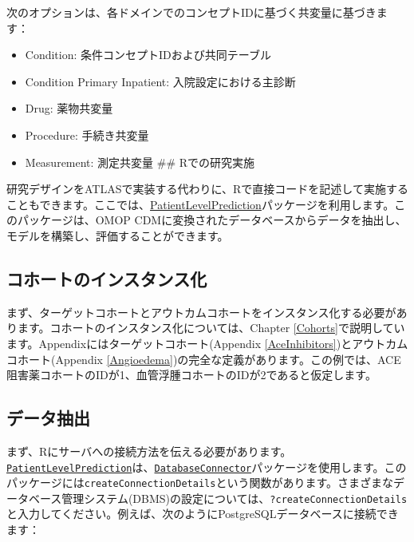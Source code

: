 \documentclass[
  11pt]{book}
\providecommand{\tightlist}{%
  \setlength{\itemsep}{0pt}\setlength{\parskip}{0pt}}
\theoremstyle{definition}
\theoremstyle{definition}
\theoremstyle{definition}
\theoremstyle{definition}
\theoremstyle{remark}
\begin{document}
次のオプションは、各ドメインでのコンセプトIDに基づく共変量に基づきます：

\begin{itemize}
\tightlist
\item
  Condition: 条件コンセプトIDおよび共同テーブル
\item
  Condition Primary Inpatient: 入院設定における主診断
\item
  Drug: 薬物共変量
\item
  Procedure: 手続き共変量
\item
  Measurement: 測定共変量
  \#\# Rでの研究実施
\end{itemize}

研究デザインをATLASで実装する代わりに、Rで直接コードを記述して実施することもできます。ここでは、\href{https://ohdsi.github.io/PatientLevelPrediction/}{PatientLevelPrediction}パッケージを利用します。このパッケージは、OMOP CDMに変換されたデータベースからデータを抽出し、モデルを構築し、評価することができます。

\subsection{コホートのインスタンス化}\label{ux30b3ux30dbux30fcux30c8ux306eux30a4ux30f3ux30b9ux30bfux30f3ux30b9ux5316-1}

まず、ターゲットコホートとアウトカムコホートをインスタンス化する必要があります。コホートのインスタンス化については、Chapter \ref{Cohorts}で説明しています。Appendixにはターゲットコホート(Appendix \ref{AceInhibitors})とアウトカムコホート(Appendix \ref{Angioedema})の完全な定義があります。この例では、ACE阻害薬コホートのIDが1、血管浮腫コホートのIDが2であると仮定します。

\subsection{データ抽出}\label{ux30c7ux30fcux30bfux62bdux51fa-2}

まず、Rにサーバへの接続方法を伝える必要があります。\href{https://ohdsi.github.io/PatientLevelPrediction/}{\texttt{PatientLevelPrediction}}は、\href{https://ohdsi.github.io/DatabaseConnector/}{\texttt{DatabaseConnector}}パッケージを使用します。このパッケージには\texttt{createConnectionDetails}という関数があります。さまざまなデータベース管理システム(DBMS)の設定については、\texttt{?createConnectionDetails}と入力してください。例えば、次のようにPostgreSQLデータベースに接続できます：
\end{document}
